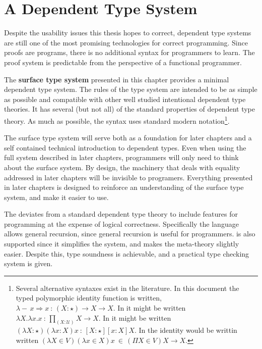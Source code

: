 \chapter{A Dependent Type System}
\label{chapter:Surface}
\thispagestyle{myheadings}
 
 
Despite the usability issues this thesis hopes to correct, dependent type systems are still one of the most promising technologies for correct programming.
Since proofs are programs, there is no additional syntax for programmers to learn.
The proof system is predictable from the perspective of a functional programmer.
 
The \textbf{surface type system} presented in this chapter provides a minimal dependent type system.
The rules of the type system are intended to be as simple as possible and compatible with other well studied intentional dependent type theories.
It has several (but not all) of the standard properties of dependent type theory.
As much as possible, the syntax uses standard modern notation\footnote{
 Several alternative syntaxes exist in the literature.
 In this document the typed polymorphic identity function is written, $\lambda-\,x\Rightarrow x\ :\,\left(X:\star\right)\rightarrow X\rightarrow X$.
 In \cite{HoTTbook} it might be written $\lambda X.\lambda x.x\ :\,\underset{\left(X:\mathcal{U}\right)}{\prod}X\rightarrow X$.
 In \cite{10.1016/0890-5401(88)90005-3} it might be written $\left(\lambda X:\star\right)\left(\lambda x:X\right)x\ :\,\left[X:\star\right]\left[x:X\right]X$.
 In \cite{Martin-Lof-1971} the identity would be writtin written $(\lambda X \in V) (\lambda x \in X)x\ \in\, (\Pi X \in V) X \rightarrow X$.
}.
 
The surface type system will serve both as a foundation for later chapters and a self contained technical introduction to dependent types.
Even when using the full system described in later chapters, programmers will only need to think about the surface system.
By design, the machinery that deals with equality addressed in later chapters will be invisible to programers.
Everything presented in later chapters is designed to reinforce an understanding of the surface type system, and make it easier to use.
 
The \slang{} deviates from a standard dependent type theory to include features for programming at the expense of logical correctness.
Specifically the language allows general recursion, since general recursion is useful for programmers.
\Tit{} is also supported since it simplifies the system, and makes the meta-theory slightly easier.
Despite this, type soundness is achievable, and a practical type checking system is given.
 
